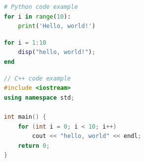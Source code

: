 \documentclass[12pt]{article}  %
\begin{document}
\begin{subappendices}

\begin{lstlisting}[language=Python, name={test.py}]
# Python code example
for i in range(10):
    print('Hello, world!')
\end{lstlisting}

\begin{lstlisting}[language=MATLAB, name={test.m}]
% MATLAB code example
for i = 1:10
    disp("hello, world!");
end
\end{lstlisting}



\begin{lstlisting}[language=C++, name={test.cpp}]
// C++ code example
#include <iostream>
using namespace std;

int main() {
    for (int i = 0; i < 10; i++)
        cout << "hello, world" << endl;
    return 0;
}
\end{lstlisting}

\end{subappendices}  %
\end{document}
